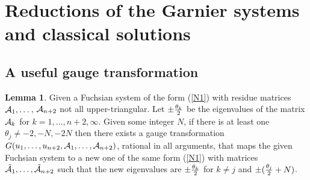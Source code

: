 \documentclass[12pt]{article}
\theoremstyle{definition}
\theoremstyle{theorem}
\newtheorem{lm}[df]{Lemma}
\begin{document}




\section{Reductions of the Garnier systems and classical solutions}

\subsection{A useful gauge transformation}

\begin{lm}
Given a Fuchsian system of the form (\ref{N1}) with residue matrices
${\cal A}_1,\dots$, ${\cal A}_{n+2}$ not all upper-triangular. 
Let $\pm{\theta_k\over 2}$ be the eigenvalues of the matrix 
${\cal A}_k$ for $k=1,\dots,n+2,\infty$. 
Given some integer $N$, if there is at least one $\theta_j\neq -2,-N,-2N$
then there exists a gauge transformation 
$G(u_1,\dots,u_{n+2},{\cal A}_1,\dots,{\cal A}_{n+2})$, rational in all 
arguments, that maps the given Fuchsian system to a new one of the same form 
(\ref{N1}) with matrices $\tilde{\cal A}_1,\dots,\tilde{\cal A}_{n+2}$
such that the new eigenvalues are $\pm{\theta_k\over 2}$ for $k\neq j$ 
and $\pm({\theta_j\over 2}+N)$. 
\label{lmb0}\end{lm}
\end{document}
